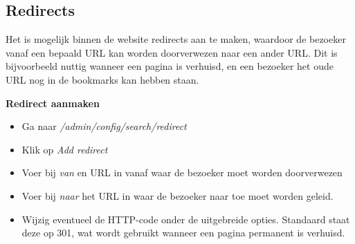 \subsection{Redirects}\label{redirects}
Het is mogelijk binnen de website redirects aan te maken, waardoor de bezoeker vanaf een bepaald URL kan worden doorverwezen naar een ander URL. Dit is bijvoorbeeld nuttig wanneer een pagina is verhuisd, en een bezoeker het oude URL nog in de bookmarks kan hebben staan.

\textbf{Redirect aanmaken}

\begin{itemize}
\item Ga naar \emph{/admin/config/search/redirect}
\item Klik op \emph{Add redirect}
\item Voer bij \emph{van} en URL in vanaf waar de bezoeker moet worden doorverwezen
\item Voer bij \emph{naar} het URL in waar de bezoeker naar toe moet worden geleid.
\item Wijzig eventueel de HTTP-code onder de uitgebreide opties. Standaard staat deze op 301, wat wordt gebruikt wanneer een pagina permanent is verhuisd.
\end{itemize}